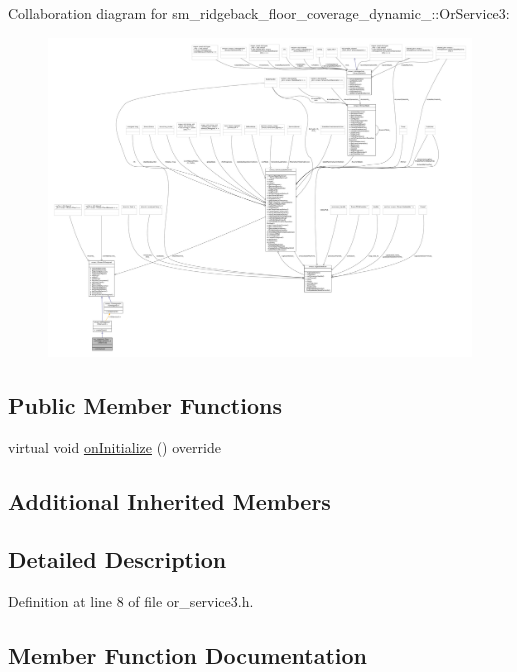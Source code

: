 Collaboration diagram for sm\+\_\+ridgeback\+\_\+floor\+\_\+coverage\+\_\+dynamic\+\_\+:\+:Or\+Service3\+:
\nopagebreak
\begin{figure}[H]
\begin{center}
\leavevmode
\includegraphics[width=350pt]{classsm__ridgeback__floor__coverage__dynamic__1_1_1OrService3__coll__graph}
\end{center}
\end{figure}
\subsection*{Public Member Functions}
\begin{DoxyCompactItemize}
\item 
virtual void \hyperlink{classsm__ridgeback__floor__coverage__dynamic__1_1_1OrService3_ae196d56602b646d38f9cd17df74120d9}{on\+Initialize} () override
\end{DoxyCompactItemize}
\subsection*{Additional Inherited Members}


\subsection{Detailed Description}


Definition at line 8 of file or\+\_\+service3.\+h.



\subsection{Member Function Documentation}
\mbox{\label{classsm__ridgeback__floor__coverage__dynamic__1_1_1OrService3_ae196d56602b646d38f9cd17df74120d9}} 
